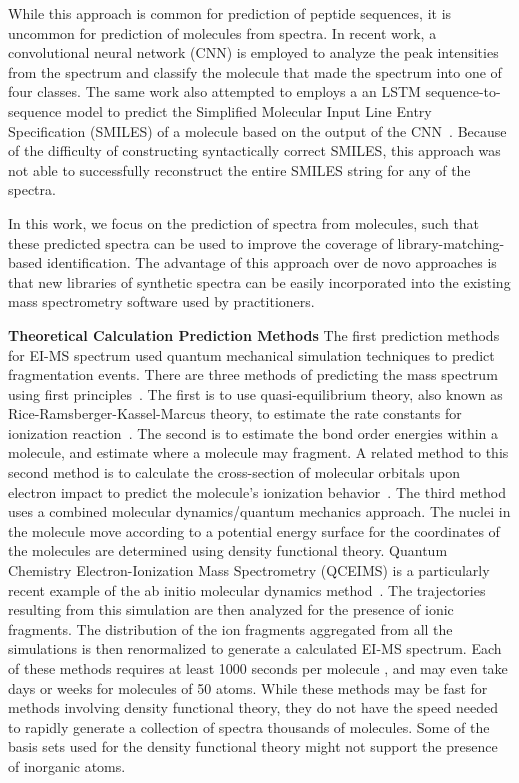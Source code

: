 \documentclass{article}
\begin{document}
While this approach is common for prediction of peptide sequences, it is uncommon for prediction of molecules from spectra. In recent work, a convolutional neural network (CNN) is employed to analyze the peak intensities from the spectrum and classify the molecule that made the spectrum into one of four classes\cite{spec2smiles}. The same work also attempted to employs a an LSTM sequence-to-sequence model to predict the Simplified Molecular Input Line Entry Specification (SMILES) of a molecule based on the output of the CNN~\cite{spec2smiles}. Because of the difficulty of constructing syntactically correct SMILES, this approach was not able to successfully reconstruct the entire SMILES string for any of the spectra.
    
In this work, we focus on the prediction of spectra from molecules, such that these predicted spectra can be used to improve the coverage of library-matching-based identification. The advantage of this approach over de novo approaches is that new libraries of synthetic spectra can be easily incorporated into the existing mass spectrometry software used by practitioners.
  
    
\textbf{Theoretical Calculation Prediction Methods} 
The first prediction methods for EI-MS spectrum used quantum mechanical simulation techniques to predict fragmentation events. There are three methods of predicting the mass spectrum using first principles~\cite{bauer2016compute}.
The first is to use quasi-equilibrium theory, also known as Rice-Ramsberger-Kassel-Marcus theory, to estimate the rate constants for ionization reaction~\cite{lorquet1994whither, lorquet2000landmarks, rosenstock1952absolute}.
The second is to estimate the bond order energies within a molecule, and estimate where a molecule may fragment. A related method to this second method is to calculate the cross-section of molecular orbitals upon electron impact to predict the molecule's ionization behavior~\cite{irikura2017ab, Guerra_BEB_model}.
The third method uses a combined molecular dynamics/quantum mechanics approach. The nuclei in the molecule move according to a potential energy surface for the coordinates of the molecules are determined using density functional theory. Quantum Chemistry Electron-Ionization Mass Spectrometry (QCEIMS) is a particularly recent example of the ab initio molecular dynamics method~\cite{grimme2013towards,Asgeirsson_QCEIMS,bauer2016compute}.
The trajectories resulting from this simulation are then analyzed for the presence of ionic fragments. The distribution of the ion fragments aggregated from all the simulations is then renormalized to generate a calculated EI-MS spectrum.
Each of these methods requires at least 1000 seconds per molecule \cite{allen2016computational}, and may even take days or weeks for molecules of 50 atoms. While these methods may be fast for methods involving density functional theory, they do not have the speed needed to rapidly generate a collection of spectra thousands of molecules. Some of the basis sets used for the density functional theory might not support the presence of inorganic atoms.
    
\end{document}
